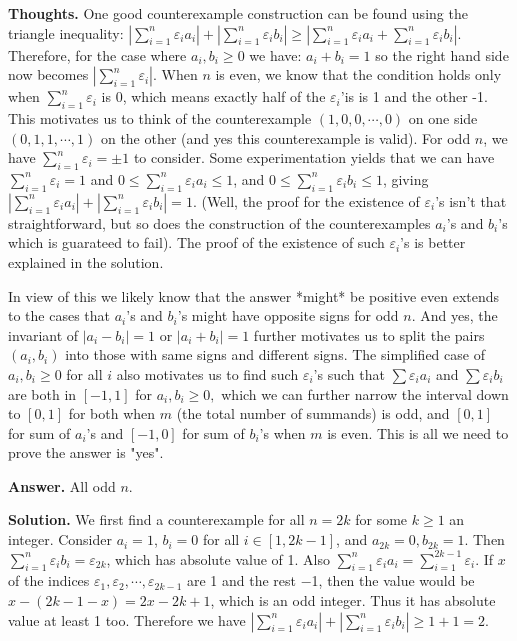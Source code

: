 \documentclass[11pt,a4paper]{article}
\begin{document}
\begin{itemize}
\textbf{Thoughts.} 
One good counterexample construction can be found using the triangle inequality: 
$ \left| \sum_{i=1}^n \varepsilon_i a_i \right| + \left| \sum_{i=1}^n \varepsilon_i b_i \right|\ge  \left| \sum_{i=1}^n \varepsilon_i a_i + \sum_{i=1}^n \varepsilon_i b_i \right|$. 
Therefore, for the case where $a_i, b_i\ge 0$ we have: 
$a_i+b_i=1$ 
so the right hand side now becomes $\left| \sum_{i=1}^n \varepsilon_i \right|$. 
When $n$ is even, we know that the condition holds only when $\sum_{i=1}^n \varepsilon_i$ is 0, which means exactly half of the $\varepsilon_i$'is is 1 and the other -1. 
This motivates us to think of the counterexample $(1, 0, 0, \cdots , 0)$ on one side $(0, 1, 1, \cdots, 1)$ on the other (and yes this counterexample is valid). 
For odd $n$, we have $\sum_{i=1}^n \varepsilon_i=\pm 1$ to consider. 
Some experimentation yields that we can have $\sum_{i=1}^n \varepsilon_i= 1$ and 
$0\le \sum_{i=1}^n \varepsilon_i a_i\le 1$, and 
$0\le \sum_{i=1}^n \varepsilon_i b_i\le 1$, giving 
$| \sum_{i=1}^n \varepsilon_i a_i|+|\sum_{i=1}^n \varepsilon_i b_i|= 1$. 
(Well, the proof for the existence of $\varepsilon_i$'s isn't that straightforward, but so does the construction of the counterexamples $a_i$'s and $b_i$'s which is guarateed to fail). The proof of the existence of such $\varepsilon_i$'s is better explained in the solution. 

In view of this we likely know that the answer *might* be positive even extends to the cases that $a_i$'s and $b_i$'s might have opposite signs for odd $n$. And yes, the invariant of $|a_i-b_i|=1$ or $|a_i+b_i|=1$ further motivates us to split the pairs $(a_i, b_i)$ into those with same signs and different signs. The simplified case of $a_i, b_i\ge 0$ for all $i$ also motivates us to find such $\varepsilon_i$'s such that $\sum\varepsilon_i a_i$ and $\sum\varepsilon_i b_i$ are both in $[-1, 1]$ for $a_i, b_i\ge 0, $ which we can further narrow the interval down to $[0, 1]$ for both when $m$ (the total number of summands) is odd, and $[0, 1]$ for sum of $a_i$'s and $[-1, 0]$ for sum of $b_i$'s when $m$ is even. This is all we need to prove the answer is "yes". 

\textbf{Answer.} All odd $n$. 

\textbf{Solution.} 
We first find a counterexample for all $n=2k$ for some $k\ge 1$ an integer. 
Consider $a_i=1$, $b_i=0$ for all $i\in [1, 2k-1]$, 
and $a_{2k}=0, b_{2k}=1$. 
Then $\sum_{i=1}^n \varepsilon_i b_i=\varepsilon_{2k}$, which has absolute value of 1. 
Also $\sum_{i=1}^n \varepsilon_i a_i=\sum_{i=1}^{2k-1} \varepsilon_i$. 
If $x$ of the indices $\varepsilon_1, \varepsilon_2, \cdots , \varepsilon_{2k-1}$ are 1 and the rest $-$1, 
then the value would be $x-(2k-1-x)=2x-2k+1$, which is an odd integer. Thus it has absolute value at least 1 too. 
Therefore we have 
$\left| \sum_{i=1}^n \varepsilon_i a_i \right| + \left| \sum_{i=1}^n \varepsilon_i b_i \right|\ge 1+1=2$. 


\end{itemize}
\end{document}

